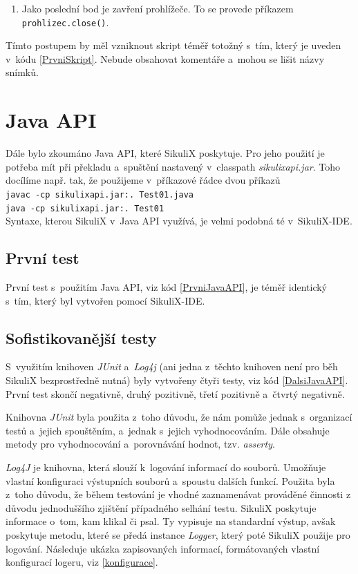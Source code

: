 \begin{enumerate}
\begin{figure}[ht!]
					\end{figure}
					\FloatBarrier
				\item Jako poslední bod je zavření prohlížeče. To se provede příkazem\\\texttt{prohlizec.close()}.
			\end{enumerate}
			Tímto postupem by měl vzniknout skript téměř totožný s~tím, který je uveden v~kódu \ref{PrvniSkript}. Nebude obsahovat komentáře a~mohou se lišit názvy snímků.
		
			
		
	\section{Java API}
	Dále bylo zkoumáno Java API, které SikuliX poskytuje. Pro jeho použití je potřeba mít při překladu a~spuštění nastavený v~classpath \emph{sikulixapi.jar}. Toho docílíme např. tak, že použijeme v~příkazové řádce dvou příkazů\\\texttt{javac -cp sikulixapi.jar:. Test01.java}\\\texttt{java -cp sikulixapi.jar:. Test01}\\ Syntaxe, kterou SikuliX v~Java API využívá, je velmi podobná té v~SikuliX-IDE.
	
		\subsection{První test}
		První test s~použitím Java API, viz kód \ref{PrvniJavaAPI}, je téměř identický s~tím, který byl vytvořen pomocí SikuliX-IDE.
		
			
	
		\subsection{Sofistikovanější testy}
		S~využitím knihoven \emph{JUnit} a~\emph{Log4j} (ani jedna z~těchto knihoven není pro běh SikuliX bezprostředně nutná) byly vytvořeny čtyři testy, viz kód \ref{DalsiJavaAPI}. První test skončí negativně, druhý pozitivně, třetí pozitivně a~čtvrtý negativně.
		
		Knihovna \emph{JUnit} byla použita z~toho důvodu, že nám pomůže jednak s~organizací testů a~jejich spouštěním, a~jednak s~jejich vyhodnocováním. Dále obsahuje metody pro vyhodnocování a~porovnávání hodnot, tzv. \emph{asserty}.
		
		\emph{Log4J} je knihovna, která slouží k~logování informací do souborů. Umožňuje vlastní konfiguraci výstupních souborů a~spoustu dalších funkcí. Použita byla z~toho důvodu, že během testování je vhodné zaznamenávat prováděné činnosti z důvodu jednoduššího zjištění případného selhání testu. SikuliX poskytuje informace o~tom, kam klikal či psal. Ty vypisuje na standardní výstup, avšak poskytuje metodu, které se předá instance \emph{Logger}, který poté SikuliX použije pro logování. Následuje ukázka zapisovaných informací, formátovaných vlastní konfigurací logeru, viz \ref{konfigurace}.
		